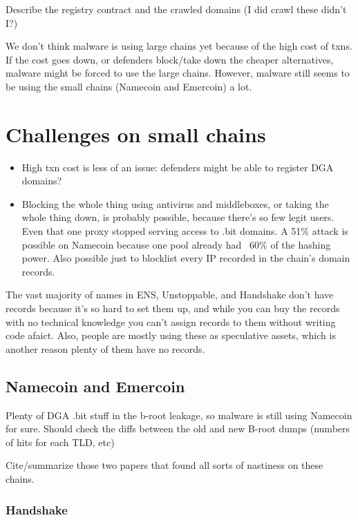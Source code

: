 \documentclass[10pt,sigconf,letterpaper]{acmart}
\begin{document}
Describe the registry contract and the crawled domains (I did 
crawl these didn't I?)

We don't think malware is using large chains yet because of 
the high cost of txns. If the cost goes down, or defenders 
block/take down the cheaper alternatives, malware might be 
forced to use the large chains. However, malware still seems 
to be using the small chains (Namecoin and Emercoin) a lot.

\section{Challenges on small chains}
\begin{itemize}
	\item High txn cost is less of an issue: defenders might 
	be able to register DGA domains? 
	\item Blocking the whole thing using antivirus and 
	middleboxes, or taking the whole thing down, is probably 
	possible, because there's so few legit users. Even that 
	one proxy stopped serving access to .bit domains. A 51\% 
	attack is possible on Namecoin because one pool already 
	had ~60\% of the hashing power. Also possible just to 
	blocklist every IP recorded in the chain's domain records.
\end{itemize}

The vast majority of names in ENS, Unstoppable, and Handshake 
don't have records because it's so hard to set them up, and 
while you can buy the records with no technical knowledge you 
can't assign records to them without writing code afaict. 
Also, people are mostly using these as speculative assets, 
which is another reason plenty of them have no records.

\subsection{Namecoin and Emercoin}

Plenty of DGA .bit stuff in the b-root leakage, so malware is 
still using Namecoin for sure. Should check the diffs between 
the old and new B-root dumps (numbers of hits for each TLD, 
etc)

Cite/summarize those two papers that found all sorts of 
nastiness on these chains.

\subsubsection{Handshake}
\end{document}
